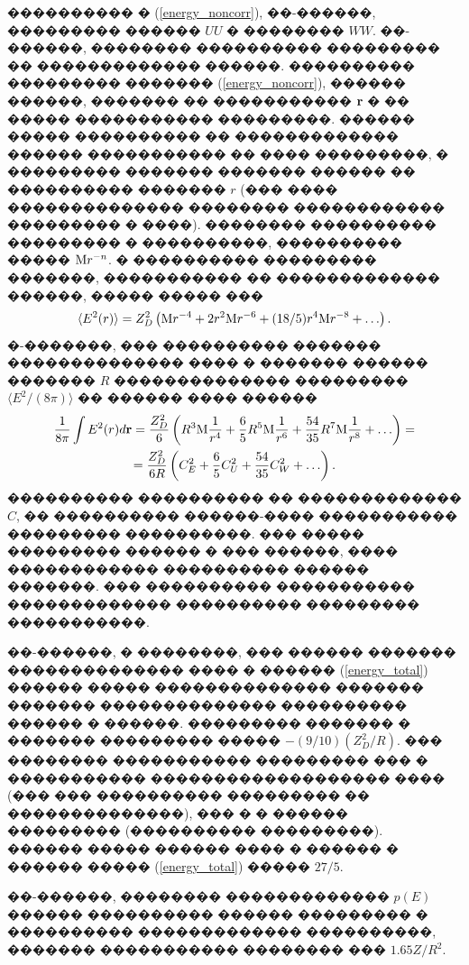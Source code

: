 \documentclass[12pt,titlepage]{article}
\newcommand\M{{\rm M}} %
\begin{document}
���������� � (\ref{energy_noncorr}), ��-������, ��������� ������ $UU$ � �������� $WW$. ��-������, �������� ���������� ��������� �� ������������� ������. ���������� ��������� ������� (\ref{energy_noncorr}), ������ ������, ������� �� ����������� ${\bf r}$ � �� ����� ����������� ���������. ������ ����� ���������� �� ������������� ������ ����������� �� ���� ���������, � ��������� ������� ������� ������ �� ���������� ������� $r$ (��� ���� �������������� �������� ������������ ��������� � ����). �������� ���������� ��������� � ����������, ���������� ����� $\M r^{-n}$. � ���������� ��������� �������, ����������� �� ������������� ������, ����� ����� ���
\begin{equation}
    \label{energy_angle_av}
    \langle E^2(r) \rangle = Z_D^2\left( \M r^{-4} + 2 r^2 \M r^{-6} + (18/5) r^4 \M r^{-8} + \ldots \right).
\end{equation}
�-�������, ��� ���������� ������� �������������� ���� � ������� ������ ������� $R$ �������������� ��������� $\langle E^2/(8 \pi) \rangle$ �� ������ ���� ������
\begin{gather}
    \frac{1}{8\pi}\int E^2 (r) d{\bf r} = \frac{Z_D^2}{6} \left( R^3 \M \frac{1}{r^4} + \frac{6}{5} R^5 \M \frac{1}{r^6} + \frac{54}{35} R^7 \M \frac{1}{r^8} + \ldots \right) = \notag \\
    \label{energy_total}
    = \frac{Z_D^2}{6 R} \left(C_E^2 + \frac{6}{5} C_U^2 + \frac{54}{35} C_W^2 + \ldots\right).
\end{gather}
���������� ���������� �� ������������� $C$, �� ���������� ������-���� ����������� ��������� ����������. ��� ����� ��������� ������ � ��� ������, ���� ������������ ���������� ������ �������. ��� ���������� ����������� ������������� ���������� ��������� �����������.

��-������, � \cite{Kalitkin2018} ��������, ��� ������ ������� �������������� ���� � ������ (\ref{energy_total}) ������ ����� �������������� ������� ������� �������������� ���������� ������ � ������. ��������� ������� � ������� ��������� ����� $-(9/10) (Z_D^2/R)$. ��� �������� ����������� ��������� ��� � ����������� ������������������� ���� (��� ��� ���������� ��������� �� ��������������), ��� � � ������ ��������� (���������� ���������). ������ ����� ������ ���� � ������ � ������ ����� (\ref{energy_total}) ����� $27/5$.

��-������, �������� ������������� $p(E)$ ������ ���������� ������ ��������� � ���������� ������������� ����������, ������� ����������� �������� ��� $1.65 Z/R^2$.
\end{document}
